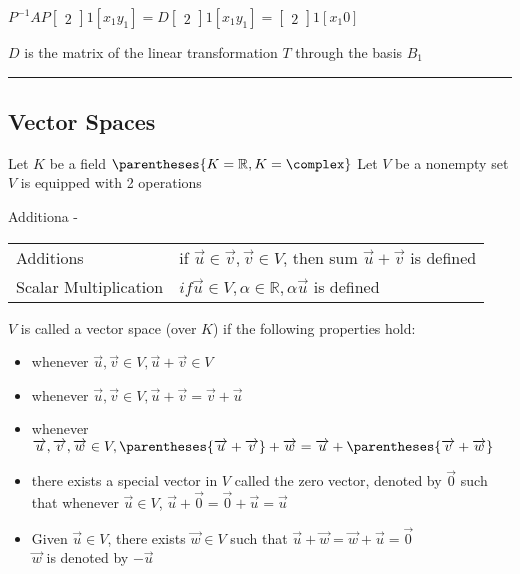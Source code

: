 \documentclass[12pt]{article}
\renewcommand{\vec}[1]{\overrightarrow{#1}}
\newcommand\m[1]{\begin{bmatrix}#1\end{bmatrix}}
\newcommand\real[0]{\mathbb{R}}
\newcommand{\divider}[0]{\rule{\textwidth}{0.1pt}}
\begin{document}
$P^{-1}AP \m21[x_1 y_1] = D \m21[x_1 y_1] = \m21[x_1 0]$

$D$ is the matrix of the linear transformation $T$ through the basis $B_1$

\divider

\subsection{Vector Spaces}

Let $K$ be a field $\parentheses{K = \real, K = \complex}$
Let $V$ be a nonempty set
$V$ is equipped with 2 operations

Additiona - 

\begin{tabular}{@{} l l}
	Additions	& if $\vec{u} \in \vec{v}, \vec{v} \in V$, then sum $\vec{u} + \vec{v}$ is defined \\
	Scalar Multiplication & $if \vec{u} \in V, \alpha \in \real, \alpha \vec{u}$ is defined
\end{tabular}

$V$ is called a vector space (over $K$) if the following properties hold:

\begin{itemize}
	\item whenever $\vec{u}, \vec{v} \in V, \vec{u} + \vec{v} \in V$
	\item whenever $\vec{u}, \vec{v} \in V, \vec{u} + \vec{v} = \vec{v} + \vec{u}$
	\item whenever $\vec{u}, \vec{v}, \vec{w} \in V, \parentheses{\vec{u} + \vec{v}} + \vec{w} = \vec{u} + \parentheses{\vec{v} + \vec{w}}$
	\item there exists a special vector in $V$ called the zero vector, denoted by $\vec{0}$ such that whenever $\vec{u} \in V$, $\vec{u} + \vec{0} = \vec{0} + \vec{u} = \vec{u}$
	\item Given $\vec{u} \in V$, there exists $\vec{w} \in V$ such that $\vec{u} + \vec{w} = \vec{w} + \vec{u} = \vec{0}$ \\
	$\vec{w}$ is denoted by $-\vec{u}$
\end{itemize}

\end{document}
